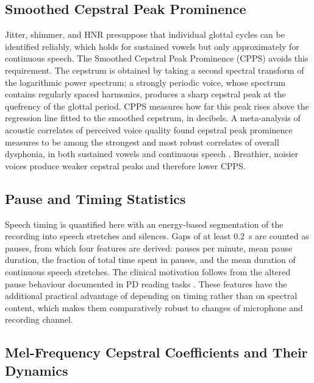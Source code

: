 \subsection{Smoothed Cepstral Peak Prominence}

Jitter, shimmer, and HNR presuppose that individual glottal cycles can
be identified reliably, which holds for sustained vowels but only
approximately for continuous speech. The Smoothed Cepstral Peak
Prominence (CPPS) avoids this requirement. The cepstrum is obtained by
taking a second spectral transform of the logarithmic power spectrum;
a strongly periodic voice, whose spectrum contains regularly spaced
harmonics, produces a sharp cepstral peak at the quefrency of the
glottal period. CPPS measures how far this peak rises above the
regression line fitted to the smoothed cepstrum, in decibels. A
meta-analysis of acoustic correlates of perceived voice quality found
cepstral peak prominence measures to be among the strongest and most
robust correlates of overall dysphonia, in both sustained vowels and
continuous speech \cite{maryn2009}. Breathier, noisier voices produce
weaker cepstral peaks and therefore lower CPPS.

\subsection{Pause and Timing Statistics}

Speech timing is quantified here with an energy-based segmentation of
the recording into speech stretches and silences. Gaps of at least
0.2~s are counted as pauses, from which four features are derived:
pauses per minute, mean pause duration, the fraction of total time
spent in pauses, and the mean duration of continuous speech stretches.
The clinical motivation follows from the altered pause behaviour
documented in PD reading tasks \cite{skodda2008}. These features have
the additional practical advantage of depending on timing rather than
on spectral content, which makes them comparatively robust to changes
of microphone and recording channel.

\subsection{Mel-Frequency Cepstral Coefficients and Their Dynamics}

